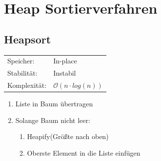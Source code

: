 \documentclass[12pt,a4paper]{article}
\begin{document}
\section{Heap Sortierverfahren}
\subsection{Heapsort}
\begin{tabularx}{\textwidth}{l l}
	Speicher: &In-place\\
	Stabilität: &Instabil\\
	Komplexität: &$\mathcal{O}(n \cdot log(n))$\\
\end{tabularx}
\vspace{.8cm}
\newline
\begin{minipage}[c]{0.5\textwidth}
	\begin{enumerate}
		\item Liste in Baum übertragen
		\item Solange Baum nicht leer:
		\begin{enumerate}
			\item Heapify(Größte nach oben)
			\item Oberste Element in die Liste einfügen
		\end{enumerate}
	\end{enumerate}
\end{minipage}
\end{document}
